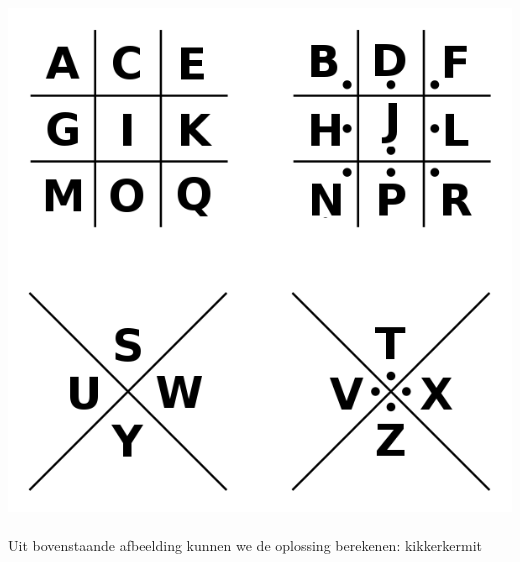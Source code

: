 \includegraphics[scale=0.5]{encryptie/oef16.png}
\\\\Uit bovenstaande afbeelding kunnen we de oplossing berekenen: kikkerkermit